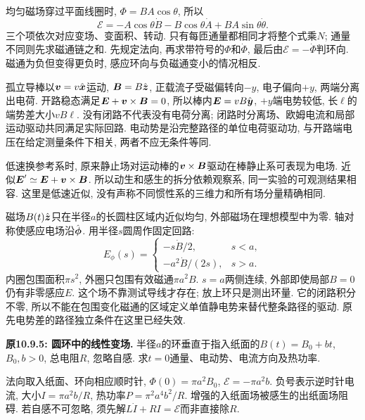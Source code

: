 \label{tb:motional}
均匀磁场穿过平面线圈时, $\Phi=BA\cos\theta$, 所以
\[\mathcal E=-A\cos\theta\dot B-B\cos\theta\dot A+BA\sin\theta\dot\theta.\]
三个项依次对应变场、变面积、转动. 只有每匝通量都相同才将整个式乘$N$; 通量不同则先求磁通链之和. 先规定法向, 再求带符号的$\Phi$和$\dot\Phi$, 最后由$\mathcal E=-\dot\Phi$判环向. 磁通为负但变得更负时, 感应环向与负磁通变小的情况相反.

孤立导棒以$\boldsymbol{v}=v\hat{\boldsymbol{x}}$运动, $\boldsymbol{B}=B\hat{\boldsymbol{z}}$, 正载流子受磁偏转向$-y$, 电子偏向$+y$, 两端分离出电荷. 开路稳态满足$\boldsymbol{E}+\boldsymbol{v}\times\boldsymbol{B}=0$, 所以棒内$\boldsymbol{E}=vB\hat{\boldsymbol{y}}$, $+y$端电势较低, 长$\ell$的端势差大小$vB\ell$. 没有闭路不代表没有电荷分离; 闭路时分离场、欧姆电流和局部运动驱动共同满足实际回路. 电动势是沿完整路径的单位电荷驱动功, 与开路端电压在给定测量条件下相关, 两者不应无条件等同.

低速换参考系时, 原来静止场对运动棒的$\boldsymbol{v}\times\boldsymbol{B}$驱动在棒静止系可表现为电场. 近似$\boldsymbol{E}'\simeq\boldsymbol{E}+\boldsymbol{v}\times\boldsymbol{B}$. 所以动生和感生的拆分依赖观察系, 同一实验的可观测结果相容. 这里是低速近似, 没有声称不同惯性系的三维力和所有场分量精确相同.

\label{tb:induced-e}
磁场$B(t)\hat{\boldsymbol{z}}$只在半径$a$的长圆柱区域内近似均匀, 外部磁场在理想模型中为零. 轴对称使感应电场沿$\hat{\boldsymbol{\phi}}$. 用半径$s$圆周作固定回路:
\[E_\phi(s)=\begin{cases}-s\dot B/2,&s<a,\\ -a^2\dot B/(2s),&s>a.\end{cases}\]
内圈包围面积$\pi s^2$, 外圈只包围有效磁通$\pi a^2B$. $s=a$两侧连续, 外部即使局部$B=0$仍有非零感应$E$. 这个场不靠测试导线才存在; 放上环只是测出环量. 它的闭路积分不零, 所以不能在包围变化磁通的区域定义单值静电势来替代整条路径的驱动. 原先电势差的路径独立条件在这里已经失效.

\begin{example}
\textbf{原10.9.5: 圆环中的线性变场.} 
半径$a$的环垂直于指入纸面的$B(t)=B_0+bt$, $B_0,b>0$, 总电阻$R$, 忽略自感. 求$t=0$通量、电动势、电流方向及热功率.
\end{example}
\begin{solution}
法向取入纸面、环向相应顺时针, $\Phi(0)=\pi a^2B_0$, $\mathcal E=-\pi a^2b$. 负号表示逆时针电流, 大小$I=\pi a^2b/R$, 热功率$P=\pi^2a^4b^2/R$. 增强的入纸面场被感生的出纸面场阻碍. 若自感不可忽略, 须先解$L\dot I+RI=\mathcal E$而非直接除$R$.
\end{solution}

